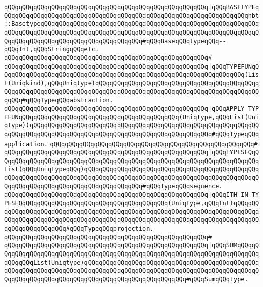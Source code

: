 \verb|qQQqqQQqqQQqqQQqqQQqqQQqqQQqqQQqqQQqqQQqqQQqqQQqqQQqqQQq|\verb#|qQQqBASETYPEqQQqqQQqqQQqqQQqqQQqqQQqqQQqqQQqqQQqqQQqqQQqqQQqqQQqqQQqqQQqqQQqqQQqhbt::BasetypeqQQqqQQqqQQqqQQqqQQqqQQqqQQqqQQqqQQqqQQqqQQqqQQqqQQqqQQqqQQqqQQqqQQqqQQqqQQqqQQqqQQqqQQqqQQqqQQqqQQqqQQqqQQqqQQqqQQqqQQqqQQqqQQqqQQqqQQqqQQqqQQqqQQqqQQqqQQqqQQqqQQqqQQq#\verb|#qQQqBaseqQQqtypeqQQq--qQQqInt,qQQqStringqQQqetc.|\newline
\verb|qQQqqQQqqQQqqQQqqQQqqQQqqQQqqQQqqQQqqQQqqQQqqQQqqQQqqQQq#|\newline
\verb|qQQqqQQqqQQqqQQqqQQqqQQqqQQqqQQqqQQqqQQqqQQqqQQqqQQqqQQq|\verb#|qQQqTYPEFUNqQQqqQQqqQQqqQQqqQQqqQQqqQQqqQQqqQQqqQQqqQQqqQQqqQQqqQQqqQQqqQQqqQQq(List(Uniqkind),qQQqUniqtype)qQQqqQQqqQQqqQQqqQQqqQQqqQQqqQQqqQQqqQQqqQQqqQQqqQQqqQQqqQQqqQQqqQQqqQQqqQQqqQQqqQQqqQQqqQQqqQQqqQQqqQQqqQQqqQQqqQQqqQQq#\verb|#qQQqTypeqQQqabstraction.|\newline
\verb|qQQqqQQqqQQqqQQqqQQqqQQqqQQqqQQqqQQqqQQqqQQqqQQqqQQqqQQq|\verb#|qQQqAPPLY_TYPEFUNqQQqqQQqqQQqqQQqqQQqqQQqqQQqqQQqqQQqqQQqqQQq(Uniqtype,qQQqList(Uniqtype))qQQqqQQqqQQqqQQqqQQqqQQqqQQqqQQqqQQqqQQqqQQqqQQqqQQqqQQqqQQqqQQqqQQqqQQqqQQqqQQqqQQqqQQqqQQqqQQqqQQqqQQqqQQqqQQqqQQqqQQq#\verb|#qQQqTypeqQQqapplication.|\newline
\verb|qQQqqQQqqQQqqQQqqQQqqQQqqQQqqQQqqQQqqQQqqQQqqQQqqQQqqQQq#|\newline
\verb|qQQqqQQqqQQqqQQqqQQqqQQqqQQqqQQqqQQqqQQqqQQqqQQqqQQqqQQq|\verb#|qQQqTYPESEQqQQqqQQqqQQqqQQqqQQqqQQqqQQqqQQqqQQqqQQqqQQqqQQqqQQqqQQqqQQqqQQqqQQqqQQqList(qQQqUniqtypeqQQq)qQQqqQQqqQQqqQQqqQQqqQQqqQQqqQQqqQQqqQQqqQQqqQQqqQQqqQQqqQQqqQQqqQQqqQQqqQQqqQQqqQQqqQQqqQQqqQQqqQQqqQQqqQQqqQQqqQQqqQQqqQQqqQQqqQQqqQQqqQQqqQQqqQQqqQQqqQQq#\verb|#qQQqTypeqQQqsequence.|\newline
\verb|qQQqqQQqqQQqqQQqqQQqqQQqqQQqqQQqqQQqqQQqqQQqqQQqqQQqqQQq|\verb#|qQQqITH_IN_TYPESEQqQQqqQQqqQQqqQQqqQQqqQQqqQQqqQQqqQQqqQQq(Uniqtype,qQQqInt)qQQqqQQqqQQqqQQqqQQqqQQqqQQqqQQqqQQqqQQqqQQqqQQqqQQqqQQqqQQqqQQqqQQqqQQqqQQqqQQqqQQqqQQqqQQqqQQqqQQqqQQqqQQqqQQqqQQqqQQqqQQqqQQqqQQqqQQqqQQqqQQqqQQqqQQqqQQqqQQqqQQq#\verb|#qQQqTypeqQQqprojection.|\newline
\verb|qQQqqQQqqQQqqQQqqQQqqQQqqQQqqQQqqQQqqQQqqQQqqQQqqQQqqQQq#|\newline
\verb|qQQqqQQqqQQqqQQqqQQqqQQqqQQqqQQqqQQqqQQqqQQqqQQqqQQqqQQq|\verb#|qQQqSUMqQQqqQQqqQQqqQQqqQQqqQQqqQQqqQQqqQQqqQQqqQQqqQQqqQQqqQQqqQQqqQQqqQQqqQQqqQQqqQQqqQQqList(Uniqtype)qQQqqQQqqQQqqQQqqQQqqQQqqQQqqQQqqQQqqQQqqQQqqQQqqQQqqQQqqQQqqQQqqQQqqQQqqQQqqQQqqQQqqQQqqQQqqQQqqQQqqQQqqQQqqQQqqQQqqQQqqQQqqQQqqQQqqQQqqQQqqQQqqQQqqQQqqQQqqQQqqQQqqQQq#\verb|#qQQqSumqQQqtype.|\newline
